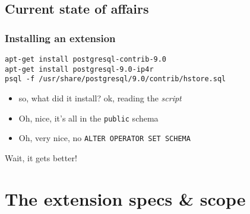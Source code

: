 \documentclass[english]{beamer}
\begin{document}
\subsection{Current state of affairs}

\begin{frame}[fragile]
  \frametitle{Installing an extension}

  \begin{example}
\begin{verbatim}
apt-get install postgresql-contrib-9.0
apt-get install postgresql-9.0-ip4r
psql -f /usr/share/postgresql/9.0/contrib/hstore.sql
\end{verbatim}
  \end{example}

  \begin{itemize}
    \item<2-> so, what did it install? ok, reading the \textit{script}
    \item<3-> Oh, nice, it's all in the \texttt{public} schema
    \item<4-> Oh, very nice, no \texttt{ALTER OPERATOR SET SCHEMA}
  \end{itemize}

  \begin{center}
    Wait, it gets better!
  \end{center}
\end{frame}


\section{The extension specs \& scope}
\end{document}
